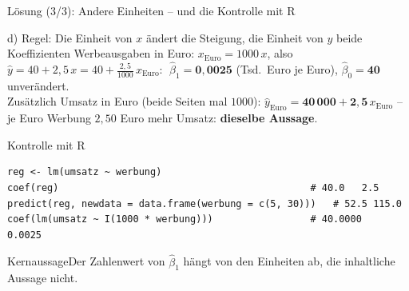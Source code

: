 \documentclass[aspectratio=169,11pt]{beamer}
\newcommand{\kernaussage}[1]{\begin{alertblock}{Kernaussage}#1\end{alertblock}}
\begin{document}
\begin{frame}[fragile]{Lösung (3/3): Andere Einheiten -- und die Kontrolle mit R}
  \small\lstset{basicstyle=\ttfamily\footnotesize,aboveskip=2pt,belowskip=2pt}
  \begin{block}{d) Regel: Die Einheit von $x$ ändert die Steigung, die Einheit von $y$ beide Koeffizienten}
    \vspace{-2pt}
    Werbeausgaben in Euro: $x_{\text{Euro}} = 1000\,x$, also
    $\hat{y} = 40 + 2{,}5\,x = 40 + \frac{2{,}5}{1000}\,x_{\text{Euro}}$:
    $\;\hat{\beta}_1 = \mathbf{0{,}0025}$ (Tsd.\ Euro je Euro), $\hat{\beta}_0 = \mathbf{40}$ unverändert.\\[1pt]
    Zusätzlich Umsatz in Euro (beide Seiten mal $1000$):
    $\hat{y}_{\text{Euro}} = \mathbf{40\,000} + \mathbf{2{,}5}\,x_{\text{Euro}}$ --
    je Euro Werbung $2{,}50$ Euro mehr Umsatz: \textbf{dieselbe Aussage}.
  \end{block}

  \begin{exampleblock}{Kontrolle mit R}
\begin{lstlisting}
reg <- lm(umsatz ~ werbung)
coef(reg)                                            # 40.0   2.5
predict(reg, newdata = data.frame(werbung = c(5, 30)))   # 52.5 115.0
coef(lm(umsatz ~ I(1000 * werbung)))                 # 40.0000   0.0025
\end{lstlisting}
  \end{exampleblock}

  \kernaussage{Der Zahlenwert von $\hat{\beta}_1$ hängt von den Einheiten ab, die
    inhaltliche Aussage nicht.}
\end{frame}
\end{document}
